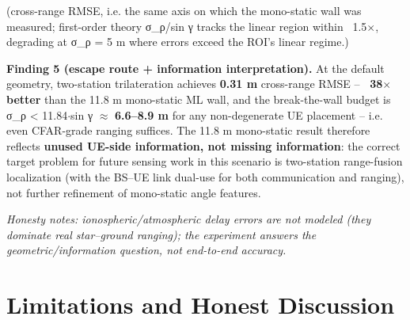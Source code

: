 \documentclass[11pt]{article}
\begin{document}
(cross-range RMSE, i.e. the same axis on which the mono-static wall was measured; first-order theory σ\_ρ/sin γ tracks the linear region within ~1.5$\times$, degrading at σ\_ρ = 5 m where errors exceed the ROI's linear regime.)

\textbf{Finding 5 (escape route + information interpretation).} At the default geometry, two-station trilateration achieves \textbf{0.31 m} cross-range RMSE -- \textbf{~38$\times$ better} than the 11.8 m mono-static ML wall, and the break-the-wall budget is σ\_ρ < 11.84$\cdot$sin γ $\approx$ \textbf{6.6--8.9 m} for any non-degenerate UE placement -- i.e. even CFAR-grade ranging suffices. The 11.8 m mono-static result therefore reflects \textbf{unused UE-side information, not missing information}: the correct target problem for future sensing work in this scenario is two-station range-fusion localization (with the BS--UE link dual-use for both communication and ranging), not further refinement of mono-static angle features.

\textit{Honesty notes: ionospheric/atmospheric delay errors are not modeled (they dominate real star--ground ranging); the experiment answers the geometric/information question, not end-to-end accuracy.}


\section{Limitations and Honest Discussion}
\end{document}
